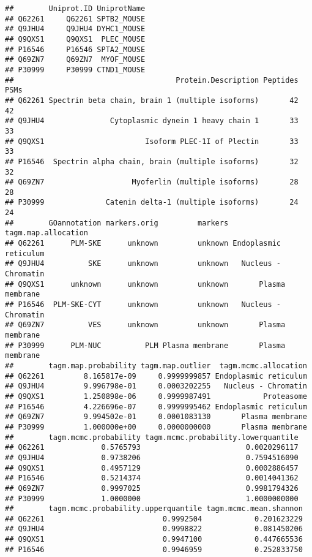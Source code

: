 \documentclass[]{article}
\begin{document}
\begin{verbatim}
##        Uniprot.ID UniprotName
## Q62261     Q62261 SPTB2_MOUSE
## Q9JHU4     Q9JHU4 DYHC1_MOUSE
## Q9QXS1     Q9QXS1  PLEC_MOUSE
## P16546     P16546 SPTA2_MOUSE
## Q69ZN7     Q69ZN7  MYOF_MOUSE
## P30999     P30999 CTND1_MOUSE
##                                     Protein.Description Peptides PSMs
## Q62261 Spectrin beta chain, brain 1 (multiple isoforms)       42   42
## Q9JHU4               Cytoplasmic dynein 1 heavy chain 1       33   33
## Q9QXS1                       Isoform PLEC-1I of Plectin       33   33
## P16546  Spectrin alpha chain, brain (multiple isoforms)       32   32
## Q69ZN7                    Myoferlin (multiple isoforms)       28   28
## P30999              Catenin delta-1 (multiple isoforms)       24   24
##        GOannotation markers.orig         markers   tagm.map.allocation
## Q62261      PLM-SKE      unknown         unknown Endoplasmic reticulum
## Q9JHU4          SKE      unknown         unknown   Nucleus - Chromatin
## Q9QXS1      unknown      unknown         unknown       Plasma membrane
## P16546  PLM-SKE-CYT      unknown         unknown   Nucleus - Chromatin
## Q69ZN7          VES      unknown         unknown       Plasma membrane
## P30999      PLM-NUC          PLM Plasma membrane       Plasma membrane
##        tagm.map.probability tagm.map.outlier  tagm.mcmc.allocation
## Q62261         8.165817e-09     0.9999999857 Endoplasmic reticulum
## Q9JHU4         9.996798e-01     0.0003202255   Nucleus - Chromatin
## Q9QXS1         1.250898e-06     0.9999987491            Proteasome
## P16546         4.226696e-07     0.9999995462 Endoplasmic reticulum
## Q69ZN7         9.994502e-01     0.0001083130       Plasma membrane
## P30999         1.000000e+00     0.0000000000       Plasma membrane
##        tagm.mcmc.probability tagm.mcmc.probability.lowerquantile
## Q62261             0.5765793                        0.0020296117
## Q9JHU4             0.9738206                        0.7594516090
## Q9QXS1             0.4957129                        0.0002886457
## P16546             0.5214374                        0.0014041362
## Q69ZN7             0.9997025                        0.9981794326
## P30999             1.0000000                        1.0000000000
##        tagm.mcmc.probability.upperquantile tagm.mcmc.mean.shannon
## Q62261                           0.9992504            0.201623229
## Q9JHU4                           0.9998822            0.081450206
## Q9QXS1                           0.9947100            0.447665536
## P16546                           0.9946959            0.252833750

\end{verbatim}
\end{document}
